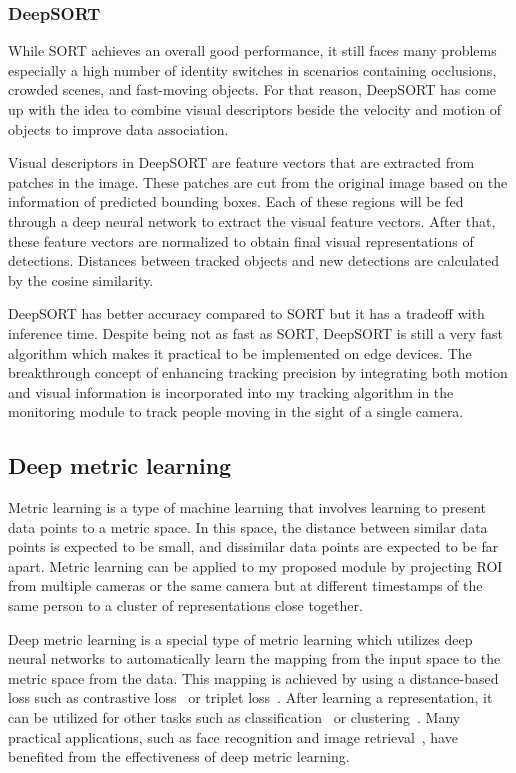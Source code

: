 \documentclass[../main.tex]{subfiles}
\begin{document}
\subsubsection{DeepSORT}
\label{subsec:deepsort}
While SORT achieves an overall good performance, it still faces many problems especially a high number of identity switches in scenarios containing occlusions, crowded scenes, and fast-moving objects. For that reason, DeepSORT has come up with the idea to combine visual descriptors beside the velocity and motion of objects to improve data association.

Visual descriptors in DeepSORT are feature vectors that are extracted from patches in the image. These patches are cut from the original image based on the information of predicted bounding boxes. Each of these regions will be fed through a deep neural network to extract the visual feature vectors. After that, these feature vectors are normalized to obtain final visual representations of detections. Distances between tracked objects and new detections are calculated by the cosine similarity. 

DeepSORT has better accuracy compared to SORT but it has a tradeoff with inference time. Despite being not as fast as SORT, DeepSORT is still a very fast algorithm which makes it practical to be implemented on edge devices. The breakthrough concept of enhancing tracking precision by integrating both motion and visual information is incorporated into my tracking algorithm in the monitoring module to track people moving in the sight of a single camera.

\subsection{Deep metric learning}
\label{sec:deepmetric}
Metric learning is a type of machine learning that involves learning to present data points to a metric space. In this space, the distance between similar data points is expected to be small, and dissimilar data points are expected to be far apart. Metric learning can be applied to my proposed module by projecting ROI from multiple cameras or the same camera but at different timestamps of the same person to a cluster of representations close together.

Deep metric learning is a special type of metric learning which utilizes deep neural networks to automatically learn the mapping from the input space to the metric space from the data. This mapping is achieved by using a distance-based loss such as contrastive loss~\cite{hadsell2006dimensionality} or triplet loss~\cite{schroff2015facenet}. After learning a representation, it can be utilized for other tasks such as classification~\cite{deng2019deep} or clustering~\cite{li2020semi}. Many practical applications, such as face recognition and image retrieval~\cite{cao2020enhancing}, have benefited from the effectiveness of deep metric learning.
\end{document}
